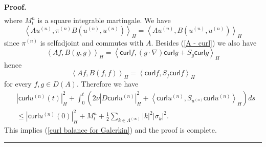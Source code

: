 \documentclass[11pt]{preprint}
\newenvironment{proof}[1][Proof]{\textbf{#1.} }{\ \rule{0.5em}{0.5em}}
\begin{document}
\begin{proof}
\begin{align*}
\end{align*}
where $M_{t}^{n}$ is a square integrable martingale. We have
\[
\left\langle Au^{\left(  n\right)  },\pi^{\left(  n\right)  }B\left(
u^{\left(  n\right)  },u^{\left(  n\right)  }\right)  \right\rangle
_{H}=\left\langle Au^{\left(  n\right)  },B\left(  u^{\left(  n\right)
},u^{\left(  n\right)  }\right)  \right\rangle _{H}%
\]
since $\pi^{\left(  n\right)  }$ is selfadjoint and commutes with $A$. Besides
(\ref{A - curl}) we also have
\[
\left\langle Af,B\left(  g,g\right)  \right\rangle _{H}=\left\langle
\mathsf{curl}f,\left(  g\cdot\nabla\right)  \mathsf{curl}g+S_{g}%
\mathsf{curl}g\right\rangle _{H}%
\]
hence
\[
\left\langle Af,B\left(  f,f\right)  \right\rangle _{H}=\left\langle
\mathsf{curl}f,S_{f}\mathsf{curl}f\right\rangle _{H}%
\]
for every $f,g\in D(A)$. Therefore we have
\begin{align*}
& \left|  \mathsf{curl}u^{\left(  n\right)  }\left(  t\right)  \right|
_{H}^{2}+\int_{0}^{t}\left(  2\nu\left|  D\mathsf{curl}u^{\left(  n\right)
}\right|  _{H}^{2}+\left\langle \mathsf{curl}u^{\left(  n\right)
},S_{u^{\left(  n\right)  }}\mathsf{curl}u^{\left(  n\right)  }\right\rangle
_{H}\right)  ds\\
& \leq\left|  \mathsf{curl}u^{\left(  n\right)  }\left(  0\right)  \right|
_{H}^{2}+M_{t}^{n}+\frac{1}{2}\sum_{k\in\Lambda^{(\infty)}}\left|  k\right|
^{2}\left|  \sigma_{k}\right|  ^{2}.
\end{align*}
This implies (\ref{curl balance for Galerkin}) and the proof is complete.
\end{proof}
\end{document}
